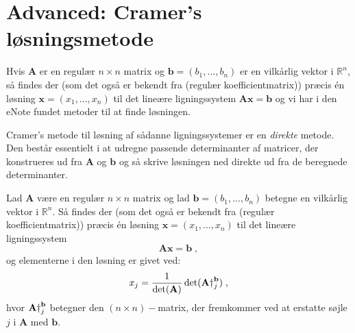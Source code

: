 


\section{Advanced: Cramer's løsningsmetode} \label{tn5.secCramer}

Hvis $\mathbf{A}$ er en regulær $n \times n$ matrix og $\mathbf{b} = (b_{1}, . . . , b_{n})$ er en vilkårlig vektor i $\mathbb{R}^{n}$, så findes der (som det også er bekendt fra  (regulær koefficientmatrix)) præcis én løsning $\mathbf{x} = (x_{1}, . . . , x_{n}) $ til det lineære ligningssystem $\mathbf{A}\mathbf{x} = \mathbf{b}$ og vi har i den eNote fundet metoder til at finde løsningen.

Cramer's metode til løsning af sådanne ligningssystemer er en \textit{direkte} metode. Den består essentielt i at udregne passende determinanter af matricer, der konstrueres ud fra $\mathbf{A}$ og $\mathbf{b}$ og så skrive løsningen ned direkte ud fra de beregnede determinanter.

\begin{theorem} \label{tn5.thmCramer}
Lad $\mathbf{A}$ være en regulær $n \times n$ matrix og lad $\mathbf{b} = (b_{1}, . . . , b_{n})$ betegne en vilkårlig vektor i $\mathbb{R}^{n}$. Så findes der (som det også er bekendt fra  (regulær koefficientmatrix)) præcis én løsning $\mathbf{x} = (x_{1}, . . . , x_{n}) $ til det lineære ligningssystem
\begin{equation} \label{tn5.eqCramerSys}
\mathbf{A}\mathbf{x} = \mathbf{b} \;,
\end{equation}
og elementerne i den løsning er givet ved:
\begin{equation} \label{tn5.eqCramerSol}
x_{j} = \frac{1}{\det(\mathbf{A})}\det(\mathbf{A}\dag_{\small{j}}^{\mathbf{b}}) \;,
\end{equation}
hvor $\mathbf{A}\dag_{\small{j}}^{\mathbf{b}}$ betegner den $(n \times n)-$matrix, der fremkommer ved at erstatte søjle $j$ i $\mathbf{A}$ med $\mathbf{b}$.
\end{theorem}

